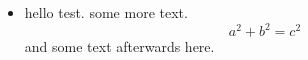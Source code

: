 \documentclass{article}
\begin{document}
\begin{itemize}
\item hello test.
  some more text.
  \begin{equation}
    a^2 + b^2 = c^2
  \end{equation}
  and some text afterwards here.
\end{itemize}
\end{document}
